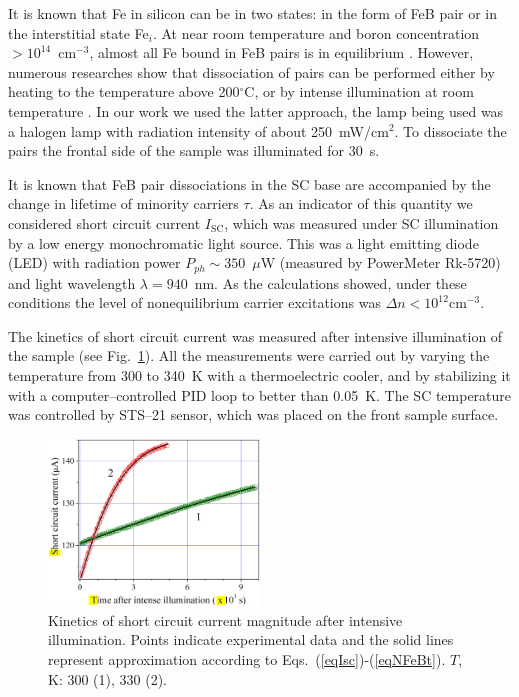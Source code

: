 \documentclass[sn-mathphys]{sn-jnl}%
\theoremstyle{thmstyleone}%
\theoremstyle{thmstyletwo}%
\theoremstyle{thmstylethree}%
\begin{document}
It is known that Fe in silicon can be in two states:
in the form of FeB pair or in the interstitial state Fe$_i$.
At near room temperature and boron concentration $>10^{14}$~cm$^{-3}$,
almost all Fe bound in FeB pairs is in equilibrium \cite{FeB:kinetic,FeBAssJAP2014,FeBAssSST2011,FeBJAP2005}.
However, numerous researches show that dissociation of pairs can be performed either by heating to the temperature above 200$^\circ$C,
or by intense illumination at room temperature \cite{FeBAssJAP2014,FeBJAP2005}.
In our work we used the latter approach, the lamp being used was a halogen lamp with radiation intensity of about 250~mW/cm$^2$.
To dissociate the pairs the frontal side of the sample was illuminated for 30~s.

It is known that FeB pair dissociations in the SC base are accompanied by the change
in lifetime of minority carriers $\tau$.
As an indicator of this quantity we considered short circuit current $I_\mathrm{SC}$,
which was measured under SC illumination by a low energy monochromatic light source.
This was a light emitting diode (LED) with radiation power $P_{ph}\sim350$~$\mu$W
(measured by PowerMeter Rk-5720) and light wavelength $\lambda=940$~nm.
As the calculations showed, under these conditions the level of nonequilibrium carrier
excitations was $\Delta n<10^{12}$cm$^{-3}$.

The kinetics of short circuit current was measured after intensive illumination of the sample
(see Fig.~\ref{figIsc}).
All the measurements were carried out by varying the temperature from 300 to 340~K with a thermoelectric cooler,
and by stabilizing it with a computer--controlled PID loop to better than 0.05~K.
The SC temperature was controlled by STS--21 sensor, which was placed on the front sample surface.

\begin{figure}
\centering
\includegraphics[width=0.5\textwidth]{Fig2}
\caption{Kinetics of short circuit current magnitude after intensive illumination.
Points indicate experimental data and the solid lines represent approximation
according to Eqs.~(\ref{eqIsc})-(\ref{eqNFeBt}).
$T$, K: 300 (1), 330 (2).}
\label{figIsc}       %
\end{figure}
\end{document}
